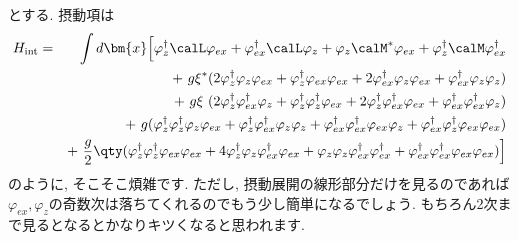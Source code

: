 \documentclass[10.5pt,a4paper]{jreport}
\begin{document}
とする. 摂動項は
\begin{eqnarray}
  \nonumber  H_{\rm int} &=& \int d\bm{x} \Bigl[\varphi_z^\dagger\calL\varphi_{ex} + \varphi_{ex}^\dagger\calL\varphi_z + \varphi_z\calM^*\varphi_{ex} + \varphi_z^\dagger\calM\varphi_{ex}^\dagger\\
    \nonumber  && +\ g\xi^*(2\varphi_z^\dagger\varphi_z\varphi_{ex} + \varphi_z^\dagger\varphi_{ex}\varphi_{ex} + 2\varphi_{ex}^\dagger\varphi_z\varphi_{ex} + \varphi_{ex}^\dagger\varphi_z\varphi_z)\\
    \nonumber  && +\ g\xi\ (2\varphi_z^\dagger\varphi_{ex}^\dagger\varphi_z + \varphi_z^\dagger\varphi_z^\dagger\varphi_{ex} + 2\varphi_z^\dagger\varphi_{ex}^\dagger\varphi_{ex} + \varphi_{ex}^\dagger\varphi_{ex}^\dagger\varphi_z)\\
    \nonumber  && +\ g(\varphi^\dagger_z\varphi^\dagger_z\varphi_z\varphi_{ex} + \varphi^\dagger_z\varphi^\dagger_{ex}\varphi_z\varphi_z + \varphi_{ex}^\dagger\varphi^\dagger_{ex}\varphi_{ex}\varphi_{z} + \varphi^\dagger_{ex}\varphi^\dagger_{z}\varphi_{ex}\varphi_{ex}) \\
    && +\ \frac{g}{2}\qty(\varphi^\dagger_z \varphi^\dagger_z \varphi_{ex}\varphi_{ex} + 4\varphi^\dagger_z \varphi_z \varphi^\dagger_{ex}\varphi_{ex} + \varphi_z \varphi_z \varphi^\dagger_{ex}\varphi^\dagger_{ex} + \varphi_{ex}^\dagger\varphi_{ex}^\dagger\varphi_{ex}\varphi_{ex})\Bigr]\label{ZeromodeHamiltonian}
\end{eqnarray}
のように, そこそこ煩雑です. ただし, 摂動展開の線形部分だけを見るのであれば$\varphi_{ex}, \varphi_z$の奇数次は落ちてくれるのでもう少し簡単になるでしょう. もちろん2次まで見るとなるとかなりキツくなると思われます.
\end{document}
